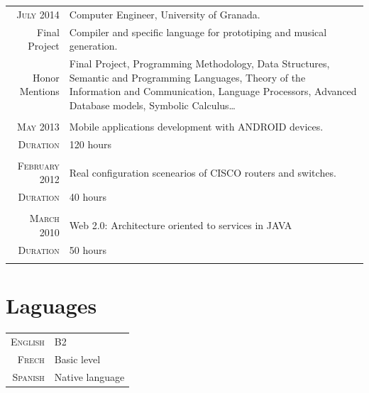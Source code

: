 \documentclass[a4paper,10pt]{article} %
\begin{document}
\begin{tabular}{r|p{11cm}}
\textsc{July} 2014 & Computer Engineer, University of Granada.\\
Final Project & Compiler and specific language for prototiping and musical
generation.\\
Honor Mentions & Final Project, Programming Methodology, Data Structures,
Semantic and Programming Languages, Theory of the Information and Communication, Language
Processors, Advanced Database models, Symbolic Calculus\ldots\\
\multicolumn{2}{c}{} \\

\textsc{May} 2013 & Mobile applications development with ANDROID
devices. \\
\textsc{Duration} & 120 hours \\
\multicolumn{2}{c}{} \\

\textsc{February} 2012 & Real configuration scenearios of CISCO routers and
switches.\\
\textsc{Duration} & 40 hours \\
\multicolumn{2}{c}{} \\

\textsc{March} 2010 & Web 2.0: Architecture oriented to services in JAVA \\
\textsc{Duration} & 50 hours\\
\multicolumn{2}{c}{} \\
\end{tabular}




\section{Laguages}

\begin{tabular}{r|p{11cm}}
\textsc{English} & B2\\
\textsc{Frech} & Basic level\\
\textsc{Spanish} & Native language\\
\end{tabular}


\end{document}

